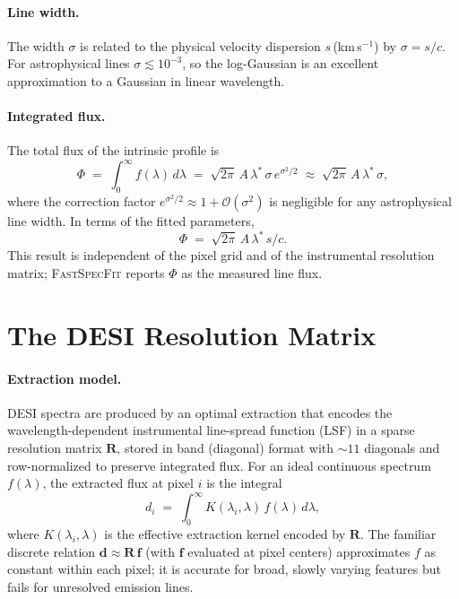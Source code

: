 \documentclass[12pt]{article}
\newcommand{\lstar}{\lambda^{*}}
\newcommand{\C}{c}                             %
\newcommand{\R}{\mathbf{R}}
\begin{document}
\paragraph{Line width.}
The width $\sigma$ is related to the physical velocity dispersion
$s$\,(km\,s$^{-1}$) by $\sigma = s/\C$.  For astrophysical lines
$\sigma \lesssim 10^{-3}$, so the log-Gaussian is an excellent
approximation to a Gaussian in linear wavelength.

\paragraph{Integrated flux.}
The total flux of the intrinsic profile is
\begin{equation}
  \Phi
  \;=\; \int_0^{\infty} f(\lambda)\,d\lambda
  \;=\; \sqrt{2\pi}\,A\,\lstar\,\sigma\,e^{\sigma^2/2}
  \;\approx\; \sqrt{2\pi}\,A\,\lstar\,\sigma,
  \label{eq:flux}
\end{equation}
where the correction factor $e^{\sigma^2/2} \approx 1 + \mathcal{O}(\sigma^2)$
is negligible for any astrophysical line width.  In terms of the fitted
parameters,
\begin{equation}
  \boxed{\Phi \;=\; \sqrt{2\pi}\,A\,\lstar\,s/\C.}
  \label{eq:flux_phys}
\end{equation}
This result is independent of the pixel grid and of the instrumental
resolution matrix; \textsc{FastSpecFit} reports $\Phi$ as the measured line
flux.


\section{The DESI Resolution Matrix}
\label{sec:resolution}

\paragraph{Extraction model.}
DESI spectra are produced by an optimal extraction that encodes the
wavelength-dependent instrumental line-spread function (LSF) in a sparse
resolution matrix $\R$, stored in band (diagonal) format with ${\sim}11$
diagonals and row-normalized to preserve integrated flux.  For an ideal
continuous spectrum $f(\lambda)$, the extracted flux at pixel $i$ is the
integral
\begin{equation}
  d_i \;=\; \int_0^\infty K(\lambda_i,\lambda)\,f(\lambda)\,d\lambda,
  \label{eq:continuous}
\end{equation}
where $K(\lambda_i,\lambda)$ is the effective extraction kernel encoded by
$\R$.  The familiar discrete relation $\mathbf{d} \approx \R\,\mathbf{f}$
(with $\mathbf{f}$ evaluated at pixel centers) approximates $f$ as constant
within each pixel; it is accurate for broad, slowly varying features but
fails for unresolved emission lines.
\end{document}
